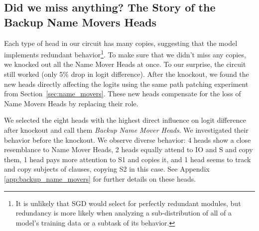 
\subsection{Did we miss anything? The Story of the Backup Name Movers Heads}
\label{sec:distributed_name_movers}


Each type of head in our circuit has many copies, suggesting that the model implements redundant behavior\footnote{It is unlikely that SGD would select for perfectly redundant modules, but redundancy is more likely when analyzing a sub-distribution of all of a model's training data or a subtask of its behavior.}. To make sure that we didn't miss any copies, we knocked out all the Name Mover Heads at once. To our surprise, the circuit still worked (only 5\% drop in logit difference). After the knockout, we found the new heads directly affecting the logits using the same path patching experiment from Section~\ref{sec:name_movers}. %
These new heads compensate for the loss of Name Movers Heads by replacing their role.

We selected the eight heads with the highest direct influence on logit difference after knockout and call them \emph{Backup Name Mover Heads}. We investigated their behavior before the knockout. We observe diverse behavior: 4 heads show a close resemblance to Name Mover Heads, 2 heads equally attend to IO and S and copy them, 1 head pays more attention to S1 and copies it, and 1 head seems to track and copy subjects of clauses, copying S2 in this case. See Appendix \ref{app:backup_name_movers} for further details on these heads.

